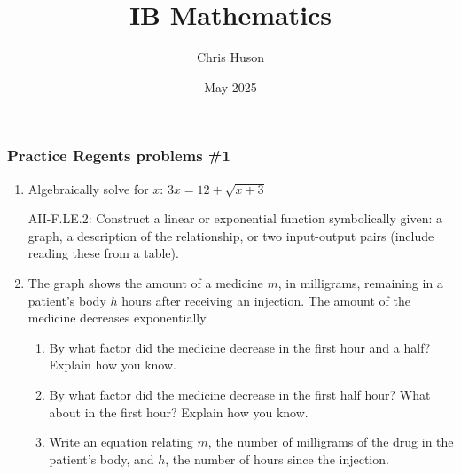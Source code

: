 \documentclass[12pt, twoside]{article}
\title{IB Mathematics}
\author{Chris Huson}
\date{May 2025}
\begin{document}
\subsubsection*{Practice Regents problems \#1}

\begin{enumerate}
\item Algebraically solve for $x$: $3x = 12 + \sqrt{x+3}$

\newpage
AII-F.LE.2: Construct a linear or exponential function symbolically given: a graph, a description of the relationship, or two input-output pairs (include reading these from a table).

\item The graph shows the amount of a medicine $m$, in milligrams, remaining in a patient's body $h$ hours after receiving an injection. The amount of the medicine decreases exponentially.
    \begin{center}
    \end{center}
    \begin{enumerate}[itemsep=3cm]
        \item By what factor did the medicine decrease in the first hour and a half? Explain how you know.
        \item By what factor did the medicine decrease in the first half hour? What about in the first hour? Explain how you know. \vspace{1cm}
        \item Write an equation relating $m$, the number of milligrams of the drug in the patient’s body, and $h$, the number of hours since the injection.
    \end{enumerate}

\end{enumerate}
\end{document}
